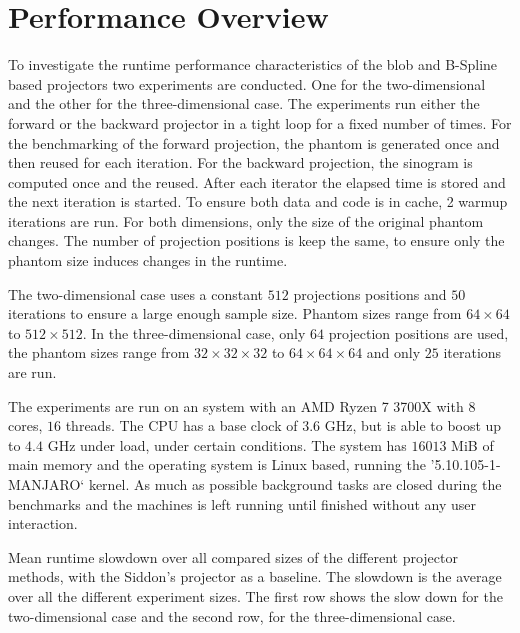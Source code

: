 \section{Performance Overview}\label{sec:experiments_performance_projection}

To investigate the runtime performance characteristics of the blob and B-Spline based projectors two
experiments are conducted. One for the two-dimensional and the other for the three-dimensional case.
The experiments run either the forward or the backward projector in a tight loop for a fixed number
of times. For the benchmarking of the forward projection, the phantom is generated once and then
reused for each iteration. For the backward projection, the sinogram is computed once and the
reused. After each iterator the elapsed time is stored and the next iteration is started. To ensure
both data and code is in cache, 2 warmup iterations are run. For both dimensions, only the size of
the original phantom changes. The number of projection positions is keep the same, to ensure only
the phantom size induces changes in the runtime.

The two-dimensional case uses a constant \(512\) projections positions and \(50\) iterations to
ensure a large enough sample size. Phantom sizes range from \(64 \times 64\) to \(512 \times 512\).
In the three-dimensional case, only \(64\) projection positions are used, the phantom sizes range
from \(32 \times 32 \times 32\) to \(64 \times 64 \times 64\) and only \(25\) iterations are run.

The experiments are run on an system with an AMD Ryzen 7 3700X with \(8\) cores, \(16\) threads. The
CPU has a base clock of \(3.6\) GHz, but is able to boost up to \(4.4\) GHz under load, under
certain conditions. The system has \(16013\) MiB of main memory and the operating system is Linux
based, running the '5.10.105-1-MANJARO` kernel. As much as possible background tasks are closed
during the benchmarks and the machines is left running until finished without any user interaction.

\begin{table}[h]%
	\centering
	\caption{Mean runtime slowdown over all compared sizes of the different projector methods,
		with the Siddon's projector as a baseline. The slowdown is the average over all the
		different experiment sizes. The first row shows the slow down for the
		two-dimensional case and the second row, for the three-dimensional case.}%
	\label{tab:runtime_slowdown}
\end{table}

